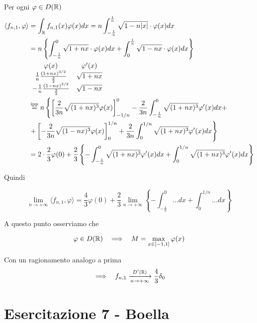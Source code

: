 \begin{enumerate}
Per ogni $\varphi \in D(\mathbb{R})$
\begin{align*}
\langle f_{n, 1}, \varphi \rangle  & = \int_{\mathbb{R}} f_{n, 1}(x) \varphi (x) dx = n\int^{\frac{1}{n}}_{- \frac{1}{n}}\sqrt{1 - n| x|} \cdot \varphi (x) dx\\
 & = n\left\{\int^{0}_{- \frac{1}{n}}\sqrt{1 + nx} \cdot \varphi (x) dx + \int^{\frac{1}{n}}_{0}\sqrt{1 - nx} \cdot \varphi (x) dx\right\}\\
 & 
 \begin{array}{c c}
\varphi (x) & \varphi '(x)\\
\frac{1}{n}\frac{(1 + nx)^{3/2}}{\frac{3}{2}} & \sqrt{1 + nx}\\
- \frac{1}{n}\frac{(1 - nx)^{3/2}}{\frac{3}{2}} & \sqrt{1 - nx}
\end{array}\\
 & \overset{\text{ipp}}{=} n\left\{\left[\frac{2}{3n}\sqrt{(1 + nx)^{3}} \varphi (x)\right]^{0}_{- 1/n} - \frac{2}{3n}\int^{0}_{- \frac{1}{n}}\sqrt{(1 + nx)^{3}} \varphi '(x)dx + \right. \\
 & \left. + \left[ - \frac{2}{3n}\sqrt{(1 - nx)^{3}} \varphi (x)\right]^{1/n}_{0} + \frac{2}{3n}\int^{1/n}_{0}\sqrt{(1 + nx)^{3}} \varphi '(x)dx\right\}\\
 & = 2 \cdot \frac{2}{3} \varphi (0) + \frac{2}{3}\left\{- \int^{0}_{- \frac{1}{n}}\sqrt{(1 + nx)^{3}} \varphi '(x)dx + \int^{1/n}_{0}\sqrt{(1 + nx)^{3}} \varphi '(x)dx\right\}
\end{align*}

Quindi

\begin{equation*}
\lim\limits_{n\rightarrow + \infty} \langle f_{n, 1}, \varphi \rangle = \frac{4}{3} \varphi (0) + \frac{2}{3}\lim\limits_{n\rightarrow + \infty}\left\{- \int^{0}_{- \frac{1}{n}} \dotsc dx + \int^{1/n}_{0} \dotsc dx\right\}
\end{equation*}

A questo punto osserviamo che

\begin{equation*}
\varphi \in D(\mathbb{R}) \ \ \implies \ \ M = \max_{x\in [ - 1, 1]} \varphi (x)
\end{equation*}

Con un ragionamento analogo a prima
\begin{equation*}
\implies \ \ f_{n, 1}\xrightarrow[n\rightarrow + \infty ]{D'(\mathbb{R})}\frac{4}{3} \delta_{0}
\end{equation*}
\end{enumerate}
\chapter{Esercitazione 7 - Boella}
\ParteEsercizi
\Esercizio{}


